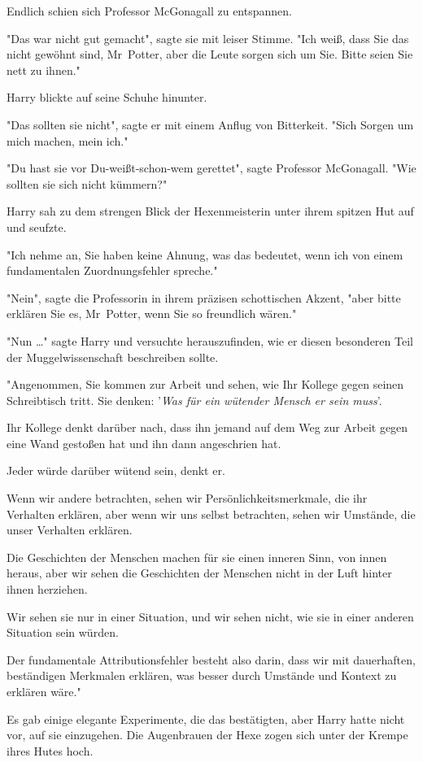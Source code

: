 {Endlich schien sich Professor McGonagall zu entspannen.

"Das war nicht gut gemacht", sagte sie mit leiser Stimme. "Ich weiß, dass Sie das nicht gewöhnt sind, Mr~Potter, aber die Leute sorgen sich um Sie. Bitte seien Sie nett zu ihnen."

Harry blickte auf seine Schuhe hinunter.

"Das sollten sie nicht", sagte er mit einem Anflug von Bitterkeit. "Sich Sorgen um mich machen, mein ich."

"Du hast sie vor Du-weißt-schon-wem gerettet", sagte Professor McGonagall. "Wie sollten sie sich nicht kümmern?"

Harry sah zu dem strengen Blick der Hexenmeisterin unter ihrem spitzen Hut auf und seufzte.

"Ich nehme an, Sie haben keine Ahnung, was das bedeutet, wenn ich von einem fundamentalen Zuordnungsfehler spreche."

"Nein", sagte die Professorin in ihrem präzisen schottischen Akzent, "aber bitte erklären Sie es, Mr~Potter, wenn Sie so freundlich wären."

"Nun …" sagte Harry und versuchte herauszufinden, wie er diesen besonderen Teil der Muggelwissenschaft beschreiben sollte.

"Angenommen, Sie kommen zur Arbeit und sehen, wie Ihr Kollege gegen seinen Schreibtisch tritt. Sie denken: '\emph{Was für ein wütender Mensch er sein muss}'.

Ihr Kollege denkt darüber nach, dass ihn jemand auf dem Weg zur Arbeit gegen eine Wand gestoßen hat und ihn dann angeschrien hat.

Jeder würde darüber wütend sein, denkt er.

Wenn wir andere betrachten, sehen wir Persönlichkeitsmerkmale, die ihr Verhalten erklären, aber wenn wir uns selbst betrachten, sehen wir Umstände, die unser Verhalten erklären.

Die Geschichten der Menschen machen für sie einen inneren Sinn, von innen heraus, aber wir sehen die Geschichten der Menschen nicht in der Luft hinter ihnen herziehen.

Wir sehen sie nur in einer Situation, und wir sehen nicht, wie sie in einer anderen Situation sein würden.

Der fundamentale Attributionsfehler besteht also darin, dass wir mit dauerhaften, beständigen Merkmalen erklären, was besser durch Umstände und Kontext zu erklären wäre."

Es gab einige elegante Experimente, die das bestätigten, aber Harry hatte nicht vor, auf sie einzugehen. Die Augenbrauen der Hexe zogen sich unter der Krempe ihres Hutes hoch.

}
